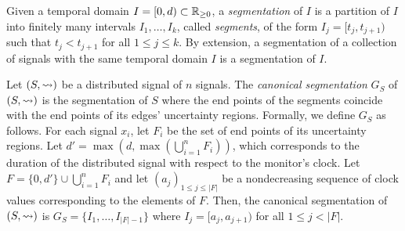 Given a temporal domain $I = [0,d) \subset \mathbb{R}_{\geq 0}$, a \emph{segmentation} of $I$ is a partition of $I$ into finitely many intervals $I_1, \ldots, I_k$, called \emph{segments}, of the form $I_j = [t_j, t_{j+1})$ such that $t_j < t_{j+1}$ for all $1 \leq j \leq k$.
By extension, a segmentation of a collection of signals with the same temporal domain $I$ is a segmentation of $I$.


Let $(S,{\rightsquigarrow})$ be a distributed signal of $n$ signals.
The \emph{canonical segmentation} $G_S$ of $(S,{\rightsquigarrow})$ is the segmentation of $S$ where the end points of the segments coincide with the end points of its edges' uncertainty regions.
Formally, we define $G_S$ as follows.
For each signal $x_i$, let $F_i$ be the set of end points of its uncertainty regions.
Let $d' = \max(d, \max (\bigcup_{i = 1}^{n} F_i))$, which corresponds to the duration of the distributed signal with respect to the monitor's clock.
%
Let $F = \{0, d'\} \cup \bigcup_{i = 1}^{n} F_i$ and let $(a_j)_{1 \leq j \leq |F|}$ be a nondecreasing sequence of clock values corresponding to the elements of $F$.
Then, the canonical segmentation of $(S,{\rightsquigarrow})$ is $G_S = \{I_1, \ldots, I_{|F| - 1}\}$ where $I_j = [a_j, a_{j+1})$ for all $1 \leq j < |F|$.

